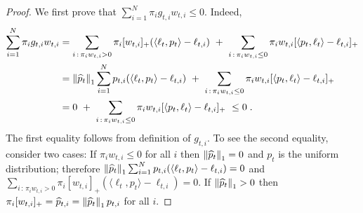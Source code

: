 \begin{proof}
We first prove that $\sum_{i=1}^N \pi_i g_{t,i} w_{t,i} \le 0$. Indeed,
\begin{align*}
\sum_{i=1}^N \pi_i g_{t,i} w_{t,i}
& = \sum_{i \, : \, \pi_i w_{t,i} > 0} \pi_i [w_{t,i}]_+ (\langle \ell_t, p_t \rangle - \ell_{t,i})  \ + \ \sum_{i \, : \, \pi_i w_{t,i} \le 0} \pi_i w_{t,i} [\langle p_t, \ell_t\rangle - \ell_{t,i}]_+ \\
& = \left\|{\widehat p_t}\right\|_1 \sum_{i=1}^N p_{t,i} (\langle \ell_t, p_t \rangle - \ell_{t,i})  \ + \ \sum_{i \, : \, \pi_i w_{t,i} \le 0} \pi_i w_{t,i} [\langle p_t, \ell_t\rangle - \ell_{t,i}]_+ \\
& = 0 \ + \ \sum_{i \, : \, \pi_i w_{t,i} \le 0} \pi_i w_{t,i} [\langle p_t, \ell_t\rangle - \ell_{t,i}]_+
\ \le 0 \; .
\end{align*}
The first equality follows from definition of $g_{t,i}$. To see the second equality,
consider two cases: If $\pi_i w_{t,i} \le 0$ for all $i$ then $\left\|{\widehat p_t}\right\|_1 = 0$ and $p_t$ is the uniform distribution;
therefore $\left\|{\widehat p_t}\right\|_1 \sum_{i=1}^N p_{t,i} (\langle \ell_t, p_t \rangle - \ell_{t,i}) = 0$ and
$\sum_{i \, : \, \pi_i w_{t,i} > 0} \pi_i [w_{t,i}]_+ (\langle \ell_t, p_t \rangle - \ell_{t,i}) = 0$.
If $\left\|{\widehat p_t}\right\|_1 > 0$ then $\pi_i [w_{t,i}]_+ = \widehat p_{t,i} = \left\|{\widehat p_t}\right\|_1 p_{t,i}$ for all $i$.


\end{proof}
